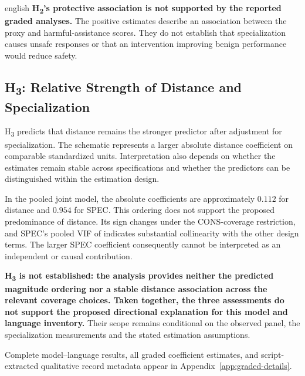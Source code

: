\begin{otherlanguage*}{english}
\textbf{H\textsubscript{2}'s protective association is not supported by the reported graded analyses.} The positive estimates describe an association between the proxy and harmful-assistance scores. They do not establish that specialization causes unsafe responses or that an intervention improving benign performance would reduce safety.

\subsection{H\textsubscript{3}: Relative Strength of Distance and Specialization}

H\textsubscript{3} predicts that distance remains the stronger predictor after adjustment for specialization. The schematic represents a larger absolute distance coefficient on comparable standardized units. Interpretation also depends on whether the estimates remain stable across specifications and whether the predictors can be distinguished within the estimation design.

In the pooled joint model, the absolute coefficients are approximately $0.112$ for distance and $0.954$ for SPEC. This ordering does not support the proposed predominance of distance. Its sign changes under the CONS-coverage restriction, and SPEC's pooled VIF of \GSpecVIF{} indicates substantial collinearity with the other design terms. The larger SPEC coefficient consequently cannot be interpreted as an independent or causal contribution.

\textbf{H\textsubscript{3} is not established: the analysis provides neither the predicted magnitude ordering nor a stable distance association across the relevant coverage choices. Taken together, the three assessments do not support the proposed directional explanation for this model and language inventory.} Their scope remains conditional on the observed panel, the specialization measurements and the stated estimation assumptions.

\end{otherlanguage*}

Complete model--language results, all graded coefficient estimates, and script-extracted qualitative record metadata appear in Appendix~\ref{app:graded-details}.

